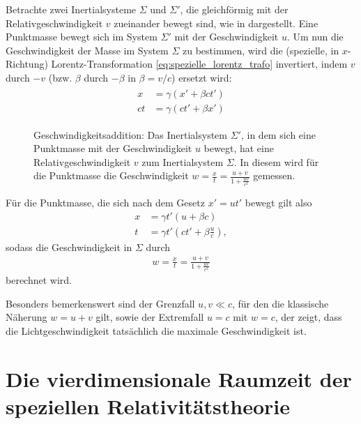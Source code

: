 Betrachte zwei Inertialsysteme $\Sigma$ und $\Sigma'$, die gleichförmig mit der Relativgeschwindigkeit  $v$ zueinander bewegt sind, wie in  dargestellt.
Eine Punktmasse bewegt sich im System $\Sigma'$ mit der Geschwindigkeit $u$.
Um nun die Geschwindigkeit der Masse im System $\Sigma$ zu bestimmen, wird die (spezielle, in $x$-Richtung) Lorentz-Transformation
\eqref{eq:spezielle_lorentz_trafo} invertiert, indem $v$ durch $-v$ (bzw. $\beta$ durch $-\beta$ in $\beta=v/c$) ersetzt wird:
\begin{align}
    \label{eq:spezielle_inv_lorentz_trafo}
    \begin{split}
        x  & =\gamma(x'+\beta ct') \\
        ct & =\gamma(ct'+\beta x')
    \end{split}
\end{align}
\begin{figure}[htp]
    \centering
    \tfigGeschwindigkeitsaddition
    \caption{Geschwindigkeitsaddition: Das Inertialsystem $\Sigma'$, in dem sich eine Punktmasse mit der Geschwindigkeit $u$ bewegt, hat eine Relativgeschwindigkeit $v$ zum Inertialsystem $\Sigma$. In diesem wird für die Punktmasse die Geschwindigkeit $w=\frac{x}{t}=\frac{u+v}{1+\frac{uv}{c^2}}$ gemessen. }
    \label{fig:Geschwindigkeitsaddition}
\end{figure}

Für die Punktmasse, die sich nach dem Gesetz $x'=ut'$ bewegt gilt also
\begin{align*}
    x & =\gamma t'(u+\beta c)              \\
    t & =\gamma t'(ct'+\beta \frac{u}{c}),
\end{align*}
sodass die Geschwindigkeit in $\Sigma$ durch
\begin{align*}
    w=\frac{x}{t}=\frac{u+v}{1+\frac{uv}{c^2}}
\end{align*}
berechnet wird.

Besonders bemerkenswert sind der Grenzfall $u,v\ll c$, für den die klassische Näherung $w=u+v$ gilt, sowie der Extremfall $u=c$ mit $w=c$, der zeigt, dass die Lichtgeschwindigkeit tatsächlich die maximale Geschwindigkeit ist.




\section{Die vierdimensionale Raumzeit der speziellen Relativitätstheorie}

